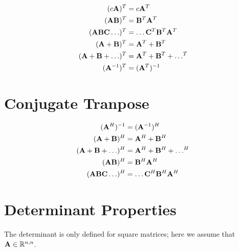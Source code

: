 \begin{align}
(c\mathbf{A})^T            &= c\mathbf{A}^T                \\
(\mathbf{A}\mathbf{B})^T          &= \mathbf{B}^T\mathbf{A}^T            \\
(\mathbf{A}\mathbf{B}\mathbf{C}\ldots)^T &= \ldots\mathbf{C}^T\mathbf{B}^T\mathbf{A}^T \\
(\mathbf{A}+\mathbf{B})^T         &= \mathbf{A}^T+\mathbf{B}^T           \\
(\mathbf{A}+\mathbf{B}+\ldots)^T  &= \mathbf{A}^T+\mathbf{B}^T+\ldots^T  \\
(\mathbf{A}^{-1})^T        &= (\mathbf{A}^T)^{-1}
\end{align}

\section{Conjugate Tranpose}

\begin{align}
(\mathbf{A}^H)^{-1}        &= (\mathbf{A}^{-1})^H          \\
(\mathbf{A}+\mathbf{B})^H         &= \mathbf{A}^H+\mathbf{B}^H           \\
(\mathbf{A}+\mathbf{B}+\ldots)^H  &= \mathbf{A}^H+\mathbf{B}^H+\ldots^H  \\
(\mathbf{A}\mathbf{B})^H          &= \mathbf{B}^H \mathbf{A}^H           \\
(\mathbf{A}\mathbf{B}\mathbf{C}\ldots)^H &= \ldots\mathbf{C}^H\mathbf{B}^H\mathbf{A}^H
\end{align}


\section{Determinant Properties}
The determinant is only defined for square matrices; here we assume that $\mathbf{A}\in\mathbb{R}^{n,n}$.

